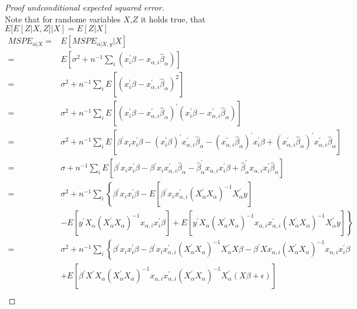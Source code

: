 \documentclass[Research_Module_ES.tex]{subfiles}
\begin{document}
	

\begin{proof}[Proof undconditional expected squared error] ~\\
	Note that for randome variables $X$,$Z$ it holds true, that $E[E[Z|X,Z]|X]=E[Z|X]$
	\begin{align*}
		MSPE_{\alpha|X}=&E[MSPE_{\alpha|X,y}|X]\\
		=&E\left[\sigma^2 + n^{-1}\sum_{i}^{}\left(x_i^\prime\beta - x_{\alpha,i}\hat{\beta}_\alpha\right)\right]\\
		=&\sigma^2 +n^{-1}\sum_iE\left[\left(x_i^\prime\beta - x_{\alpha,i}^\prime\hat{\beta}_\alpha\right)^2\right]\\
		=&\sigma^2+n^{-1}\sum_iE\left[\left(x_i^\prime\beta-x_{\alpha,i}^\prime\hat{\beta}_\alpha\right)^\prime \left(x_i^\prime\beta-x_{\alpha,i}^\prime\hat{\beta}_\alpha\right)\right]\\
		=&\sigma^2 + n^{-1}\sum_iE\left[\beta^\prime x_ix_i^\prime\beta- \left(x_i^\prime\beta\right)^\prime x_{\alpha,i}^\prime\hat{\beta}_\alpha-\left(x_{\alpha,i}^\prime\hat{\beta}_\alpha \right)^\prime x_i^\prime\beta + \left(x_{\alpha,i}^\prime\hat{\beta}_\alpha\right)^\prime x_{\alpha,i}^\prime\hat{\beta}_\alpha \right]\\
		=&\sigma + n^{-1} \sum_i E\left[\beta^\prime x_ix_i^\prime\beta-\beta^\prime x_i x_{\alpha,i}^\prime\hat{\beta}_\alpha -\hat{\beta}_\alpha^\prime x_{\alpha,i}x_i^\prime\beta+\hat{\beta}_\alpha^\prime x_{\alpha,i}x_i^\prime\hat{\beta}_\alpha \right]\\
		=&\sigma^2+n^{-1}\sum_i\left\{ \beta^\prime x_ix_i^\prime\beta - E\left[ \beta^\prime x_i x_{\alpha,i}^\prime \left(X_\alpha^\prime X_\alpha\right)^{-1} X_\alpha^\prime y\right] \right. \\
		&\left.- E\left[y^\prime X_\alpha \left(X_\alpha^\prime X_\alpha\right)^{-1}x_{\alpha,i}x_i^\prime\beta\right] +E\left[y^\prime X_\alpha \left(X_\alpha^\prime X_\alpha\right)^{-1} x_{\alpha,i}x_{\alpha,i}^\prime \left(X_\alpha^\prime X_\alpha\right)^{-1} X_\alpha^\prime y\right] \right\}\\
		=&\sigma^2 + n^{-1}\sum_i\left\{\beta^\prime x_ix_i^\prime\beta- \beta^\prime x_i x_{\alpha,i}^\prime \left(X_\alpha^\prime X_\alpha\right)^{-1} X_\alpha^\prime X\beta -\beta^\prime X x_{\alpha,i} \left(X_\alpha^\prime X_\alpha\right)^{-1}x_{\alpha,i}x_i^\prime \beta \right.\\
		&+\left. E\left[ \beta^\prime X^\prime X_\alpha \left(X_\alpha^\prime X_\alpha\right)^{-1} x_{\alpha,i}x_{\alpha,i}^\prime \left(X_\alpha^\prime X_\alpha\right)^{-1} X_\alpha^\prime \left(X\beta +\epsilon\right)\right] \right.\\

\end{align*}
\end{proof}
\end{document}
